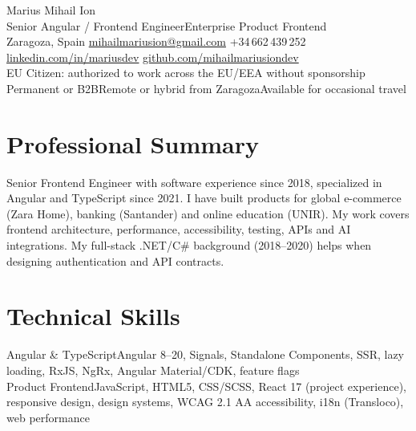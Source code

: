 \documentclass[10pt,a4paper]{article}
\newcommand{\skill}[2]{%
  {\normalsize\latosemibold #1\normalfont\enspace\color{mid}#2}\\[3pt]
}
\begin{document}
\begin{center}
  {\fontsize{20}{24}\selectfont\latosemibold{}\color{dark} Marius Mihail Ion}\\[4pt]
  {\latomedium\color{mid}\small Senior Angular / Frontend Engineer\enspace\textbar\enspace Enterprise Product Frontend}\\[4pt]
  {\latolight\footnotesize\color{light}
    Zaragoza, Spain\enspace\textbar\enspace
    \href{mailto:mihailmariusion@gmail.com}{mihailmariusion@gmail.com}\enspace\textbar\enspace
    +34\,662\,439\,252\enspace\textbar\enspace
    \href{https://linkedin.com/in/mariusdev}{linkedin.com/in/mariusdev}\enspace\textbar\enspace
    \href{https://github.com/mihailmariusiondev}{github.com/mihailmariusiondev}
  }\\[3pt]
  {\small\latosemibold\color{dark} EU Citizen: authorized to work across the EU/EEA without sponsorship}\\[1pt]
  {\latolight\footnotesize\color{light} Permanent or B2B\enspace\textbar\enspace Remote or hybrid from Zaragoza\enspace\textbar\enspace Available for occasional travel}
\end{center}
\vspace{2pt}

\section{Professional Summary}
{\normalsize\color{dark}
Senior Frontend Engineer with software experience since 2018, specialized in Angular and TypeScript since 2021. I have built products for global e-commerce (Zara Home), banking (Santander) and online education (UNIR). My work covers frontend architecture, performance, accessibility, testing, APIs and AI integrations. My full-stack .NET/C\# background (2018--2020) helps when designing authentication and API contracts.
}

\section{Technical Skills}

\skill{Angular \& TypeScript}{Angular 8--20, Signals, Standalone Components, SSR, lazy loading, RxJS, NgRx, Angular Material/CDK, feature flags}

\skill{Product Frontend}{JavaScript, HTML5, CSS/SCSS, React 17 (project experience), responsive design, design systems, WCAG 2.1 AA accessibility, i18n (Transloco), web performance}
\end{document}
